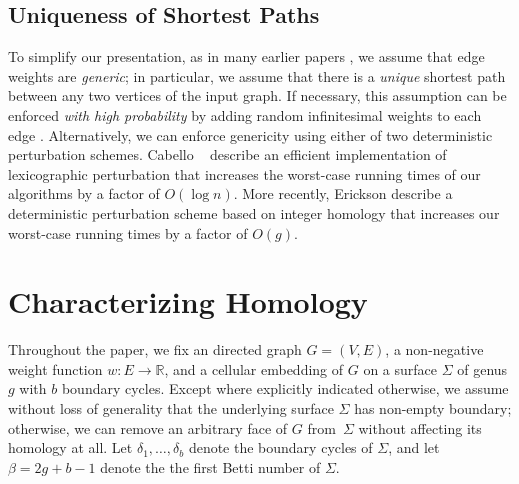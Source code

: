 \documentclass[11pt,twoside]{article}
\def\Real{\mathbb{R}}
\begin{document}


\subsection{Uniqueness of Shortest Paths}
\label{SS:unique}

To simplify our presentation, as in many earlier papers \cite{cce-msspe-13, benw-amcnt-16, mnnw-mdpgo-18, bsw-msopg-15, e-pspmf-10, eh-ocsd-04}, we assume that edge weights are \emph{generic}; in particular, we assume that there is a \emph{unique} shortest path between any two vertices of the input graph.  If necessary, this assumption can be enforced \emph{with high probability} by adding random infinitesimal weights to each edge \cite{mvv-memi-87}.  Alternatively, we can enforce genericity using either of two deterministic perturbation schemes.  Cabello \etal~\cite{cce-msspe-13} describe an efficient implementation of lexicographic perturbation \cite{c-odlp-52,dow-gsmml-55,hm-apmcb-94} that increases the worst-case running times of our algorithms by a factor of $O(\log n)$.  More recently, Erickson \etal \cite{efl-hmcpf-18} describe a deterministic perturbation scheme based on integer homology that increases our worst-case running times by a factor of $O(g)$.

\section{Characterizing Homology}
\label{S:tree-cotree}

Throughout the paper, we fix an  directed graph $G=(V,E)$, a non-negative weight function $w\colon E\to \Real$, and a cellular embedding of $G$ on a surface $\Sigma$ of genus $g$ with $b$ boundary cycles.
Except where explicitly indicated otherwise, we assume without loss of generality  that the underlying surface $\Sigma$ has non-empty boundary; otherwise, we can remove an arbitrary face of $G$ from~$\Sigma$ without affecting its homology at all.  Let $\delta_1, \dots, \delta_b$ denote the boundary cycles of $\Sigma$, and let $\beta = 2g+b-1$ denote the the first Betti number of $\Sigma$.
\end{document}

